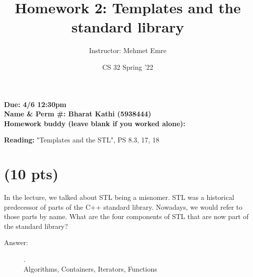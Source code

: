 \documentclass[11pt]{article}
\author{Instructor: Mehmet Emre}
\date{CS 32 Spring '22}
\title{Homework 2: Templates and the standard library}
\begin{document}
\maketitle
\textbf{Due: 4/6 12:30pm} \\ 
\textbf{Name \& Perm \#: Bharat Kathi (5938444)} \\ 
\textbf{Homework buddy (leave blank if you worked alone):}


\textbf{Reading:} "Templates and the STL", PS 8.3, 17, 18

\section{(10 pts)}
\label{sec:org04b3bf2}
In the lecture, we talked about STL being a misnomer. STL was a
historical predecessor of parts of the C++ standard
library. Nowadays, we would refer to those parts by name. What are
the four components of STL that are now part of the standard library?

\begin{description}
  \item[Answer:] .\\
  Algorithms, Containers, Iterators, Functions
\end{description}
\end{document}
